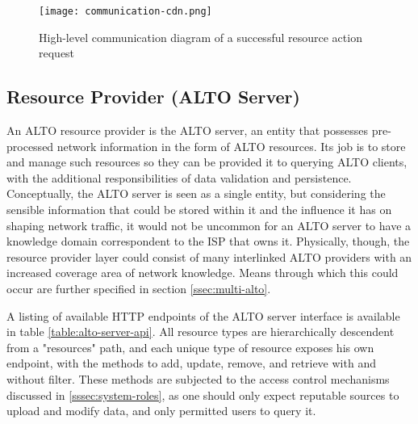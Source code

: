 \begin{figure}[h]
        \centering
        \texttt{[image: communication-cdn.png]}
        \caption{High-level communication diagram of a successful resource action request}
        \label{fig:macro-architecture}
\end{figure}

\subsection{Resource Provider (ALTO Server)}

    An ALTO resource provider is the ALTO server, an entity that possesses pre-processed network information in the form of ALTO resources.
    Its job is to store and manage such resources so they can be provided it to querying ALTO clients, with the additional responsibilities of data validation and persistence.
    Conceptually, the ALTO server is seen as a single entity, but considering the sensible information that could be stored within it and the influence it has on shaping network traffic, it would not be uncommon for an ALTO server to have a knowledge domain correspondent to the ISP that owns it.
    Physically, though, the resource provider layer could consist of many interlinked ALTO providers with an increased coverage area of network knowledge.
    Means through which this could occur are further specified in section \ref{ssec:multi-alto}.

    A listing of available HTTP endpoints of the ALTO server interface is available in table \ref{table:alto-server-api}.
    All resource types are hierarchically descendent from a "resources" path, and each unique type of resource exposes his own endpoint, with the methods to add, update, remove, and retrieve with and without filter.
    These methods are subjected to the access control mechanisms discussed in \ref{sssec:system-roles}, as one should only expect reputable sources to upload and modify data, and only permitted users to query it.

